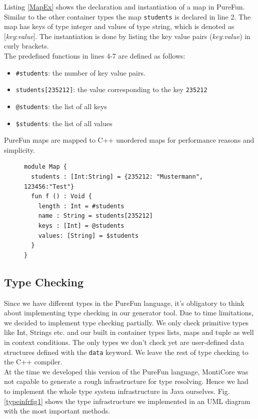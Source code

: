 Listing \ref{MapEx} shows the declaration and instantiation of a map in PureFun. Similar to the other container types the map \texttt{students} is declared in line 2. The map has keys of type integer and values of type string, which is denoted as [\textit{key}:\textit{value}]. The instantiation is done by listing the key value pairs (\textit{key}:\textit{value}) in curly brackets.\\
The predefined functions in lines 4-7 are defined as follows:
\begin{itemize}
\item \texttt{\#students}: the number of key value pairs.
\item \texttt{students[235212]}: the value corresponding to the key \texttt{235212}
\item \texttt{@students}: the list of all keys
\item \texttt{\$students}: the list of all values
\end{itemize}
PureFun maps are mapped to C++ unordered maps for performance reasons and simplicity.
\begin{figure}
\begin{lstlisting}[caption={PureFun code with a map and its predefined functions.},label={MapEx}]
module Map {
  students : [Int:String] = {235212: "Mustermann", 123456:"Test"}
  fun f () : Void {
    length : Int = #students
    name : String = students[235212]
    keys : [Int] = @students
    values: [String] = $students
  }
}
\end{lstlisting}
\end{figure}
\subsection{Type Checking}

Since we have different types in the PureFun language, it's obligatory to think about implementing type checking in our generator tool. Due to time limitations, we decided to implement type checking partially. We only check primitive types like Int, Strings etc. and our built in container types lists, maps and tuple as well in context conditions. The only types we don't check yet are user-defined data structures defined with the \texttt{data} keyword. We leave the rest of type checking to the C++ compiler.\\
At the time we developed this version of the PureFun language, MontiCore was not capable to generate a rough infrastructure for type resolving. Hence we had to implement the whole type system infrastructure in Java ourselves. Fig. \ref{typeinfrfig1} shows the type infrastructure we implemented in an UML diagram with the most important methods.

